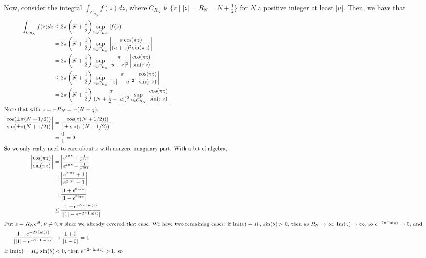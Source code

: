 \documentclass[12pt,letterpaper]{article}
\theoremstyle{definition}
\DeclareMathOperator{\imag}{Im}
\begin{document}
Now, consider the integral $\int_{C_{R_{N}}}f(z)dz$, where $C_{R_{N}}$ is $\{z \mid |z| = R_{N} = N + \frac{1}{2}\}$ for $N$ a positive integer at least $|u|$. Then, we have that
\begin{align*}
  \int_{C_{R_{N}}}f(z)dz &\leq 2\pi \left(N + \frac{1}{2}\right) \sup_{z \in C_{R_{N}}}\left|f(z)\right| \\
                         &=  2\pi \left(N + \frac{1}{2}\right) \sup_{z \in C_{R_{N}}}\left|\frac{\pi \cos(\pi z)}{(u + z)^{2}\sin(\pi z)}\right| \\
                         &=  2\pi \left(N + \frac{1}{2}\right) \sup_{z \in C_{R_{N}}}\frac{\pi}{|u+z|^{2}}\left|\frac{\cos(\pi z)}{\sin(\pi z)}\right| \\
                         &\leq  2\pi \left(N + \frac{1}{2}\right) \sup_{z \in C_{R_{N}}}\frac{\pi}{||z|-|u||^{2}}\left|\frac{\cos(\pi z)}{\sin(\pi z)}\right| \\
                         &= 2\pi \left(N + \frac{1}{2}\right)\frac{\pi}{(N + \frac{1}{2} - |u|)^{2}} \sup_{z \in C_{R_{N}}}\left|\frac{\cos(\pi z)}{\sin(\pi z)}\right| \\
  \intertext{Note that with $z = \pm R_{N} = \pm (N + \frac{1}{2})$,}
  \left|\frac{\cos(\pm\pi(N + 1/2))}{\sin(\pm\pi(N+1/2))}\right| &= \frac{|\cos(\pi(N + 1/2))|}{|\pm \sin(\pi(N+1/2))|} \\
                         &= \frac{0}{1} = 0 \\
  \intertext{So we only really need to care about $z$ with nonzero imaginary part. With a bit of algebra,}
  \left|\frac{\cos(\pi z)}{\sin(\pi z)}\right| &= \left|\frac{e^{i \pi z} + \frac{1}{e^{i \pi z}}}{e^{i \pi z} - \frac{1}{e^{i \pi z}}}\right| \\
                         &= \left|\frac{e^{2i \pi z} + 1}{e^{2i \pi z} - 1}\right| \\
                         &= \frac{|1 + e^{2i \pi z}|}{|1 - e^{2i \pi z}|} \\
                         &\leq \frac{1 + e^{-2\pi \imag(z)}}{||1| - e^{-2\pi \imag(z)}|} \\
  \intertext{Put $z = R_{N}e^{i\theta}$, $\theta \neq 0, \pi$ since we already covered that case. We have two remaining cases: if $\imag(z) = R_{N}\sin(\theta) > 0$, then as $R_{N} \rightarrow \infty$, $\imag(z) \rightarrow \infty$, so $e^{-2\pi \imag(z)} \rightarrow 0$, and}
  \frac{1 + e^{-2\pi \imag(z)}}{||1| - e^{-2\pi \imag(z)}|} &\rightarrow \frac{1 + 0}{|1 - 0|} = 1 \\
  \intertext{If $\imag(z) = R_{N}\sin(\theta) < 0$, then $e^{-2\pi \imag(z)} > 1$, so}

\end{align*}
\end{document}
